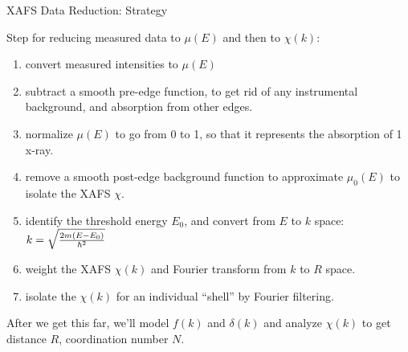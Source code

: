 
\begin{slide}{XAFS Data Reduction: Strategy}
 
  Step for reducing measured data to ${\mu(E)}$ and then
  to ${\chi(k)}$:

  \begin{enumerate}
  \item convert measured intensities to ${\mu(E)}$
  \item subtract a smooth pre-edge function, to get rid of any instrumental
    background, and absorption from other edges. 
  \item normalize ${\mu(E)}$ to go from 0 to 1, so that it represents the
    absorption of 1 x-ray.
  \item remove a smooth post-edge background function to approximate
    ${\mu_0(E)}$ to isolate the XAFS ${\chi}$.
  \item identify the threshold energy ${E_0}$, and convert from
    ${E}$ to ${k}$ space: ${ k=
      \sqrt{{{2m(E-E_0)}\over{\hbar^2}}} }$
  \item weight the XAFS ${\chi(k)}$ and Fourier transform from
    ${k}$ to ${R}$ space.
  \item  isolate the ${\chi(k)}$ for an individual
  ``shell''  by Fourier filtering.
  \end{enumerate}


  \vmm\vmm

  After we get this far, we'll model ${f(k)}$ and
  ${\delta(k)}$ and analyze ${\chi(k)}$ to get distance
  ${R}$, coordination number ${N}$.


\vfill
\end{slide} 
